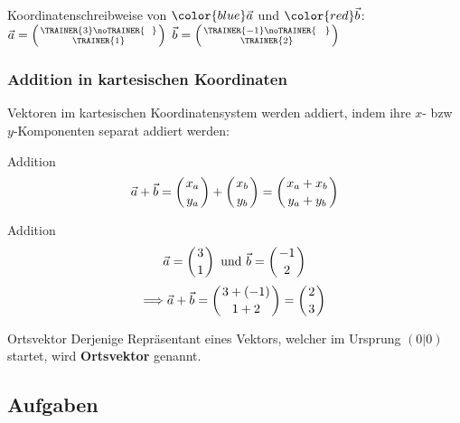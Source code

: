Koordinatenschreibweise von $\color{blue}\vec{a}$ und $\color{red}\vec{b}$:\,\,
$\vec{a} = \left( \TRAINER{3}\noTRAINER{\,\,\,\,} \atop \TRAINER{1} \right)$
$\vec{b} = \left( \TRAINER{-1}\noTRAINER{\,\,\,\,\,} \atop \TRAINER{2} \right)$
\newpage
\subsubsection{Addition in kartesischen Koordinaten}
Vektoren im kartesischen Koordinatensystem werden addiert, indem ihre
$x$- bzw $y$-Komponenten separat addiert werden:

\begin{gesetz}{Addition}{}
$$\vec{a} + \vec{b} =   \left(x_a \atop y_a \right)  + \left( x_b \atop y_b \right) =
  \left( x_a + x_b \atop y_a + y_b \right)$$
  \end{gesetz}

\begin{beispiel}{Addition}{}
  $$\vec{a} = \left(3\atop 1\right) \text{ und } \vec{b} = \left(-1
  \atop 2\right)$$
  $$\Longrightarrow \vec{a} + \vec{b} = \left(3 + (-1) \atop 1 +
  2\right) = \left(2 \atop 3\right)$$
  \end{beispiel}

\begin{definition}{Ortsvektor}{}
  Derjenige Repräsentant eines Vektors, welcher im Ursprung $(0|0)$
  startet, wird \textbf{Ortsvektor} genannt.
  \end{definition}

\subsection*{Aufgaben}    
\newpage




\newpage

